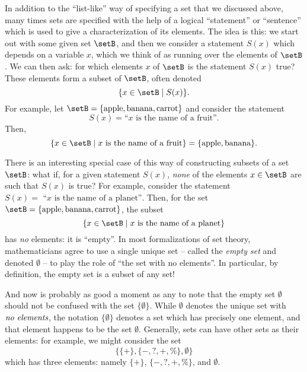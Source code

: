 {In addition to the ``list-like'' way of specifying a set that we discussed above, many times sets are specified with the help of a logical ``statement'' or ``sentence'' which is used to give a characterization of its elements. The idea is this: we start out with some given set $\setB$, and then we consider a statement $S(x)$ which depends on a variable $x$, which we think of as running over the elements of $\setB$. We can then ask: for which elements $x$ of $\setB$ is the statement $S(x)$ true? These elements form a subset of $\setB$, often denoted 
\begin{equation}
\{ x \in \setB \mid S(x) \}.
\end{equation}
For example, let $\setB = \{ \text{apple}, \text{banana}, \text{carrot} \}$ and consider the statement 
\begin{equation}
S(x) = \text{``} x \text{ is the name of a fruit''}.
\end{equation}
Then, 
\begin{equation}
\{ x \in \setB \mid x \text{ is the name of a fruit} \} = \{ \text{apple}, \text{banana} \}.
\end{equation}

There is an interesting special case of this way of constructing subsets of a set $\setB$: what if, for a given statement $S(x)$, \emph{none} of the elements $x \in \setB$ are such that $S(x)$ is true? For example, consider the statement $S(x) =\text{ ``} x \text{ is the name of a planet''}$. Then, for the set $\setB = \{ \text{apple}, \text{banana}, \text{carrot} \}$, the subset 
\begin{equation}
\{ x \in \setB \mid x \text{ is the name of a planet} \}
\end{equation}
has \emph{no} elements: it is ``empty''. In most formalizations of set theory, mathematicians agree to use a single unique set -- called the \emph{empty set} and denoted $\emptyset$ -- to play the role of ``the set with no elements''. In particular, by definition, the empty set is a subset of any set!

And now is probably as good a moment as any to note that the empty set $\emptyset$ should not be confused with the set $\{ \emptyset \}$. While $\emptyset$ denotes the unique set with $\emph{no elements}$, the notation $\{ \emptyset \}$ denotes a set which has precisely one element, and that element happens to be the set $\emptyset$. Generally, sets can have other sets as their elements: for example, we might consider the set
\begin{equation}
\{ \{ + \}, \{ -, ?, +, \% \}, \emptyset \}
\end{equation}
which has three elements: namely $\{ + \}$, $\{ -, ?, +, \% \}$,  and $\emptyset$. 


}
